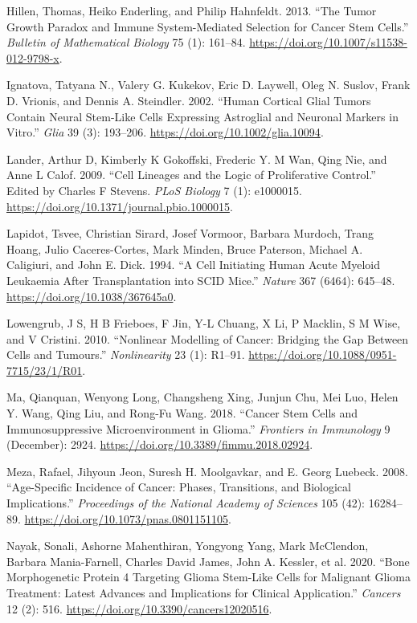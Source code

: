 \documentclass[
  letterpaper,
]{scrreprt}
\newlength{\cslhangindent}
\newenvironment{CSLReferences}[2] %
 {\begin{list}{}{%
  \setlength{\itemindent}{0pt}
  \setlength{\leftmargin}{0pt}
  \setlength{\parsep}{0pt}
  \ifodd #1
   \setlength{\leftmargin}{\cslhangindent}
   \setlength{\itemindent}{-1\cslhangindent}
  \fi
  \setlength{\itemsep}{#2\baselineskip}}}
 {\end{list}}
\theoremstyle{definition}
\theoremstyle{remark}
\begin{document}
\begin{CSLReferences}{1}{0}
Hillen, Thomas, Heiko Enderling, and Philip Hahnfeldt. 2013. {``The
Tumor Growth Paradox and Immune System-Mediated Selection for Cancer
Stem Cells.''} \emph{Bulletin of Mathematical Biology} 75 (1): 161--84.
\url{https://doi.org/10.1007/s11538-012-9798-x}.

Ignatova, Tatyana N., Valery G. Kukekov, Eric D. Laywell, Oleg N.
Suslov, Frank D. Vrionis, and Dennis A. Steindler. 2002. {``Human
Cortical Glial Tumors Contain Neural Stem{-}Like Cells Expressing
Astroglial and Neuronal Markers in Vitro.''} \emph{Glia} 39 (3):
193--206. \url{https://doi.org/10.1002/glia.10094}.

Lander, Arthur D, Kimberly K Gokoffski, Frederic Y. M Wan, Qing Nie, and
Anne L Calof. 2009. {``Cell Lineages and the Logic of Proliferative
Control.''} Edited by Charles F Stevens. \emph{PLoS Biology} 7 (1):
e1000015. \url{https://doi.org/10.1371/journal.pbio.1000015}.

Lapidot, Tsvee, Christian Sirard, Josef Vormoor, Barbara Murdoch, Trang
Hoang, Julio Caceres-Cortes, Mark Minden, Bruce Paterson, Michael A.
Caligiuri, and John E. Dick. 1994. {``A Cell Initiating Human Acute
Myeloid Leukaemia After Transplantation into SCID Mice.''} \emph{Nature}
367 (6464): 645--48. \url{https://doi.org/10.1038/367645a0}.

Lowengrub, J S, H B Frieboes, F Jin, Y-L Chuang, X Li, P Macklin, S M
Wise, and V Cristini. 2010. {``Nonlinear Modelling of Cancer: Bridging
the Gap Between Cells and Tumours.''} \emph{Nonlinearity} 23 (1):
R1--91. \url{https://doi.org/10.1088/0951-7715/23/1/R01}.

Ma, Qianquan, Wenyong Long, Changsheng Xing, Junjun Chu, Mei Luo, Helen
Y. Wang, Qing Liu, and Rong-Fu Wang. 2018. {``Cancer Stem Cells and
Immunosuppressive Microenvironment in Glioma.''} \emph{Frontiers in
Immunology} 9 (December): 2924.
\url{https://doi.org/10.3389/fimmu.2018.02924}.

Meza, Rafael, Jihyoun Jeon, Suresh H. Moolgavkar, and E. Georg Luebeck.
2008. {``Age-Specific Incidence of Cancer: Phases, Transitions, and
Biological Implications.''} \emph{Proceedings of the National Academy of
Sciences} 105 (42): 16284--89.
\url{https://doi.org/10.1073/pnas.0801151105}.

Nayak, Sonali, Ashorne Mahenthiran, Yongyong Yang, Mark McClendon,
Barbara Mania-Farnell, Charles David James, John A. Kessler, et al.
2020. {``Bone Morphogenetic Protein 4 Targeting Glioma Stem-Like Cells
for Malignant Glioma Treatment: Latest Advances and Implications for
Clinical Application.''} \emph{Cancers} 12 (2): 516.
\url{https://doi.org/10.3390/cancers12020516}.


\end{CSLReferences}
\end{document}
